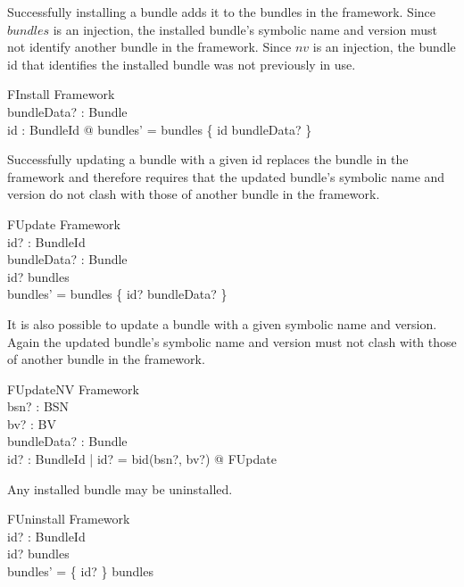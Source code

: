 \documentclass[a4paper,12pt]{article}
\begin{document}
Successfully installing a bundle adds it to the bundles in the framework.
Since $bundles$ is an injection, the installed bundle's symbolic name and version must not identify another bundle in the framework.
Since $nv$ is an injection, the bundle id that identifies the installed bundle was not previously in use.
\begin{schema}{FInstall}
\Delta Framework \\
bundleData? : Bundle \\
\where
\exists id : BundleId @ bundles' = bundles \cup \{ id \mapsto bundleData? \} \\
\end{schema}

Successfully updating a bundle with a given id replaces the bundle in the framework and therefore
requires that the updated bundle's symbolic name and version do not clash with those of another
bundle in the framework.
\begin{schema}{FUpdate}
\Delta Framework \\
id? : BundleId \\
bundleData? : Bundle \\
\where
id? \in \dom bundles \\
bundles' = bundles \oplus \{ id? \mapsto bundleData? \} \\
\end{schema}

It is also possible to update a bundle with a given symbolic name and version.
Again the updated bundle's symbolic name and version must not clash with those of another
bundle in the framework.
\begin{schema}{FUpdateNV}
\Delta Framework \\
bsn? : BSN \\
bv? : BV \\
bundleData? : Bundle \\
\where
\exists id? : BundleId | id? = bid(bsn?, bv?) @ FUpdate \\
\end{schema}

Any installed bundle may be uninstalled.
\begin{schema}{FUninstall}
\Delta Framework \\
id? : BundleId \\
\where
id? \in \dom bundles \\
bundles' =  \{ id? \} \ndres bundles \\
\end{schema}
\end{document}
